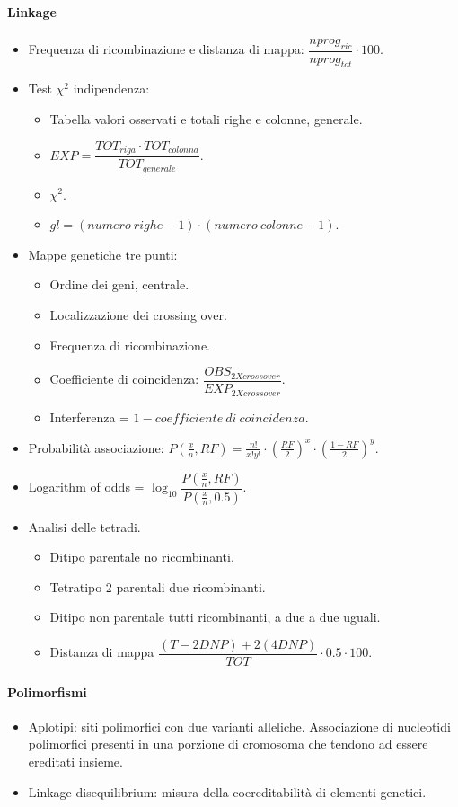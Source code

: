 \begin{multicols}{2}
\paragraph*{Linkage}
\begin{itemize}
	\item Frequenza di ricombinazione e distanza di mappa: $\dfrac{nprog_{ric}}{nprog_{tot}}\cdot 100$.
	\item Test $\chi^2$ indipendenza:
		\begin{itemize}
			\item Tabella valori osservati e totali righe e colonne, generale.
			\item $EXP = \dfrac{TOT_{riga} \cdot TOT_{colonna}}{TOT_{generale}}$.
			\item $\chi^2$.
			\item $gl = (numero\ righe -1)\cdot(numero\ colonne - 1)$.
		\end{itemize}
	\item Mappe genetiche tre punti:
		\begin{itemize}
			\item Ordine dei geni, centrale.
			\item Localizzazione dei crossing over.
			\item Frequenza di ricombinazione.
			\item Coefficiente di coincidenza: $\dfrac{OBS_{2Xcrossover}}{EXP_{2Xcrossover}}$.
			\item Interferenza = $1 - coefficiente\ di\ coincidenza$.
		\end{itemize}
	\item Probabilit\`a associazione: $P(\frac{x}{n}, RF) = \frac{n!}{x!y!}\cdot (\frac{RF}{2})^x\cdot(\frac{1-RF}{2})^y$.
	\item Logarithm of odds = $\log_10 \dfrac{P(\frac{x}{n}, RF)}{P(\frac{x}{n}, 0.5)}$.
	\item Analisi delle tetradi.
		\begin{itemize}
			\item Ditipo parentale no ricombinanti.
			\item Tetratipo 2 parentali due ricombinanti.
			\item Ditipo non parentale tutti ricombinanti, a due a due uguali.
			\item Distanza di mappa $\dfrac{(T-2DNP) + 2(4DNP)}{TOT}\cdot 0.5\cdot 100$.
		\end{itemize}
\end{itemize}

\paragraph*{Polimorfismi}
\begin{itemize}
	\item Aplotipi: siti polimorfici con due varianti alleliche.
		Associazione di nucleotidi polimorfici presenti in una porzione di cromosoma che tendono ad essere ereditati insieme.
	\item Linkage disequilibrium: misura della coereditabilit\`a di elementi genetici.
\end{itemize}


\end{multicols}
